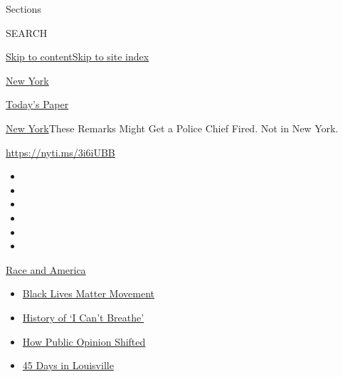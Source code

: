 Sections

SEARCH

\protect\hyperlink{site-content}{Skip to
content}\protect\hyperlink{site-index}{Skip to site index}

\href{https://www.nytimes3xbfgragh.onion/section/nyregion}{New York}

\href{https://myaccount.nytimes3xbfgragh.onion/auth/login?response_type=cookie\&client_id=vi}{}

\href{https://www.nytimes3xbfgragh.onion/section/todayspaper}{Today's
Paper}

\href{/section/nyregion}{New York}\textbar{}These Remarks Might Get a
Police Chief Fired. Not in New York.

\url{https://nyti.ms/3i6iUBB}

\begin{itemize}
\item
\item
\item
\item
\item
\item
\end{itemize}

\href{https://www.nytimes3xbfgragh.onion/news-event/george-floyd-protests-minneapolis-new-york-los-angeles?action=click\&pgtype=Article\&state=default\&region=TOP_BANNER\&context=storylines_menu}{Race
and America}

\begin{itemize}
\tightlist
\item
  \href{https://www.nytimes3xbfgragh.onion/interactive/2020/07/03/us/george-floyd-protests-crowd-size.html?action=click\&pgtype=Article\&state=default\&region=TOP_BANNER\&context=storylines_menu}{Black
  Lives Matter Movement}
\item
  \href{https://www.nytimes3xbfgragh.onion/interactive/2020/06/28/us/i-cant-breathe-police-arrest.html?action=click\&pgtype=Article\&state=default\&region=TOP_BANNER\&context=storylines_menu}{History
  of `I Can't Breathe'}
\item
  \href{https://www.nytimes3xbfgragh.onion/interactive/2020/06/10/upshot/black-lives-matter-attitudes.html?action=click\&pgtype=Article\&state=default\&region=TOP_BANNER\&context=storylines_menu}{How
  Public Opinion Shifted}
\item
  \href{https://www.nytimes3xbfgragh.onion/interactive/2020/07/16/us/black-lives-matter-protests-louisville-breonna-taylor.html?action=click\&pgtype=Article\&state=default\&region=TOP_BANNER\&context=storylines_menu}{45
  Days in Louisville}
\end{itemize}

